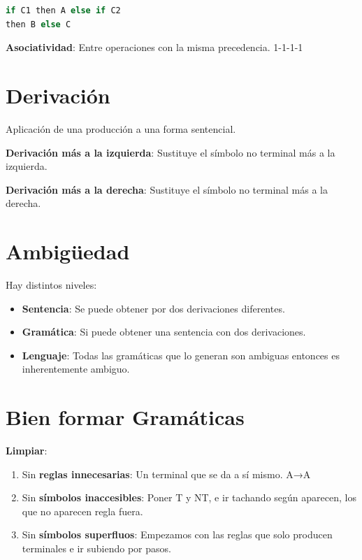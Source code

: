\documentclass[12pt]{report} %
\begin{document}
\begin{lstlisting}[language=C]
if C1 then A else if C2
then B else C
\end{lstlisting}

\textbf{Asociatividad}: Entre operaciones con la misma precedencia.
1-1-1-1


\section{Derivación}

Aplicación de una producción a una forma sentencial.

\textbf{Derivación más a la izquierda}: Sustituye el símbolo no terminal
más a la izquierda.

\textbf{Derivación más a la derecha}: Sustituye el símbolo no terminal
más a la derecha.


\section{Ambigüedad}

Hay distintos niveles:

\begin{itemize}

\item
  \textbf{Sentencia}: Se puede obtener por dos derivaciones diferentes.
\item
  \textbf{Gramática}: Si puede obtener una sentencia con dos
  derivaciones.
\item
  \textbf{Lenguaje}: Todas las gramáticas que lo generan son ambiguas
  entonces es inherentemente ambiguo.
\end{itemize}


\section{Bien formar Gramáticas}

\textbf{Limpiar}:

\begin{enumerate}
\def\labelenumi{\arabic{enumi}.}
\item
  Sin \textbf{reglas innecesarias}: Un terminal que se da a sí mismo.
  A→A
\item
  Sin \textbf{símbolos inaccesibles}: Poner T y NT, e ir tachando según
  aparecen, los que no aparecen regla fuera.
\item
  Sin \textbf{símbolos superfluos}: Empezamos con las reglas que solo
  producen terminales e ir subiendo por pasos.
\end{enumerate}
\end{document}
